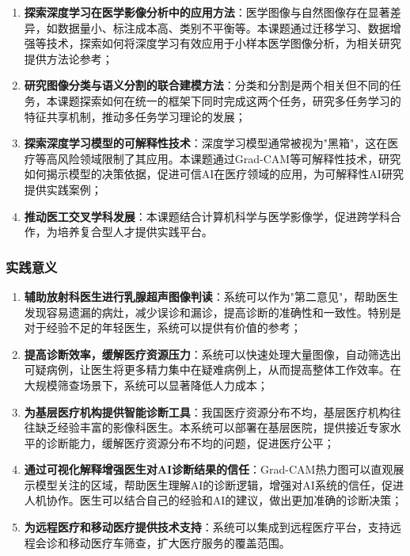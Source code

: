 \documentclass[supercite]{Hust-undergraduate-kaiti}
\theoremstyle{definition}
\begin{document}
\begin{enumerate}
    \item \textbf{探索深度学习在医学影像分析中的应用方法}：医学图像与自然图像存在显著差异，如数据量小、标注成本高、类别不平衡等。本课题通过迁移学习、数据增强等技术，探索如何将深度学习有效应用于小样本医学图像分析，为相关研究提供方法论参考；
    
    \item \textbf{研究图像分类与语义分割的联合建模方法}：分类和分割是两个相关但不同的任务，本课题探索如何在统一的框架下同时完成这两个任务，研究多任务学习的特征共享机制，推动多任务学习理论的发展；
    
    \item \textbf{探索深度学习模型的可解释性技术}：深度学习模型通常被视为"黑箱"，这在医疗等高风险领域限制了其应用。本课题通过Grad-CAM等可解释性技术，研究如何揭示模型的决策依据，促进可信AI在医疗领域的应用，为可解释性AI研究提供实践案例；
    
    \item \textbf{推动医工交叉学科发展}：本课题结合计算机科学与医学影像学，促进跨学科合作，为培养复合型人才提供实践平台。
\end{enumerate}

\subsubsection{实践意义}

\begin{enumerate}
    \item \textbf{辅助放射科医生进行乳腺超声图像判读}：系统可以作为"第二意见"，帮助医生发现容易遗漏的病灶，减少误诊和漏诊，提高诊断的准确性和一致性。特别是对于经验不足的年轻医生，系统可以提供有价值的参考；
    
    \item \textbf{提高诊断效率，缓解医疗资源压力}：系统可以快速处理大量图像，自动筛选出可疑病例，让医生将更多精力集中在疑难病例上，从而提高整体工作效率。在大规模筛查场景下，系统可以显著降低人力成本；
    
    \item \textbf{为基层医疗机构提供智能诊断工具}：我国医疗资源分布不均，基层医疗机构往往缺乏经验丰富的影像科医生。本系统可以部署在基层医院，提供接近专家水平的诊断能力，缓解医疗资源分布不均的问题，促进医疗公平；
    
    \item \textbf{通过可视化解释增强医生对AI诊断结果的信任}：Grad-CAM热力图可以直观展示模型关注的区域，帮助医生理解AI的诊断逻辑，增强对AI系统的信任，促进人机协作。医生可以结合自己的经验和AI的建议，做出更加准确的诊断决策；
    
    \item \textbf{为远程医疗和移动医疗提供技术支持}：系统可以集成到远程医疗平台，支持远程会诊和移动医疗车筛查，扩大医疗服务的覆盖范围。
\end{enumerate}
\end{document}
